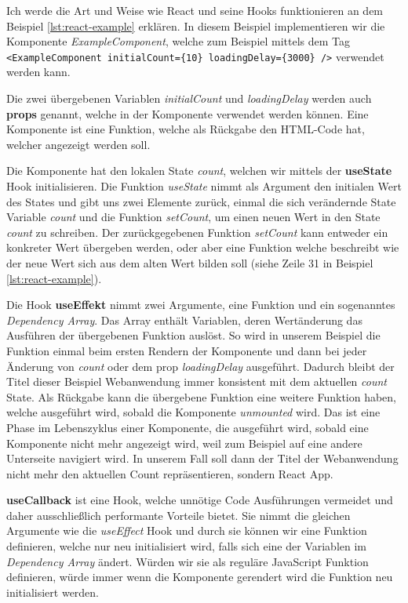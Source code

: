 \documentclass[a4paper,12pt]{report}
\begin{document}
Ich werde die Art und Weise wie React und seine Hooks funktionieren an dem Beispiel \ref{lst:react-example} erklären.
In diesem Beispiel implementieren wir die Komponente \textit{ExampleComponent}, welche zum Beispiel mittels dem Tag \verb|<ExampleComponent initialCount={10} loadingDelay={3000} />| verwendet werden kann. 

Die zwei übergebenen Variablen \textit{initialCount} und \textit{loadingDelay} werden auch \textbf{props} genannt, welche in der Komponente verwendet werden können. Eine Komponente ist eine Funktion, welche als Rückgabe den HTML-Code hat, welcher angezeigt werden soll.

Die Komponente hat den lokalen State \textit{count}, welchen wir mittels der \textbf{useState} Hook initialisieren. Die Funktion \textit{useState} nimmt als Argument den initialen Wert des States und gibt uns zwei Elemente zurück, einmal die sich verändernde State Variable \textit{count} und die Funktion \textit{setCount}, um einen neuen Wert in den State \textit{count} zu schreiben. Der zurückgegebenen Funktion \textit{setCount} kann entweder ein konkreter Wert übergeben werden, oder aber eine Funktion welche beschreibt wie der neue Wert sich aus dem alten Wert bilden soll (siehe Zeile 31 in Beispiel \ref{lst:react-example}).

Die Hook \textbf{useEffekt} nimmt zwei Argumente, eine Funktion und ein sogenanntes \textit{Dependency Array}. Das Array enthält Variablen, deren Wertänderung das Ausführen der übergebenen Funktion auslöst. So wird in unserem Beispiel die Funktion einmal beim ersten Rendern der Komponente und dann bei jeder Änderung von \textit{count} oder dem prop \textit{loadingDelay} ausgeführt. Dadurch bleibt der Titel dieser Beispiel Webanwendung immer konsistent mit dem aktuellen \textit{count} State. Als Rückgabe kann die übergebene Funktion eine weitere Funktion haben, welche ausgeführt wird, sobald die Komponente \textit{unmounted} wird. Das ist eine Phase im Lebenszyklus einer Komponente, die ausgeführt wird, sobald eine Komponente nicht mehr angezeigt wird, weil zum Beispiel auf eine andere Unterseite navigiert wird. In unserem Fall soll dann der Titel der Webanwendung nicht mehr den aktuellen Count repräsentieren, sondern \glqq React App\grqq .

\textbf{useCallback} ist eine Hook, welche unnötige Code Ausführungen vermeidet und daher ausschließlich performante Vorteile bietet. Sie nimmt die gleichen Argumente wie die \textit{useEffect} Hook und durch sie können wir eine Funktion definieren, welche nur neu initialisiert wird, falls sich eine der Variablen im \textit{Dependency Array} ändert. Würden wir sie als reguläre JavaScript Funktion definieren, würde immer wenn die Komponente gerendert wird die Funktion neu initialisiert werden.
\end{document}
